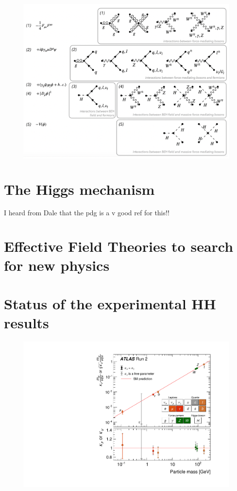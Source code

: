 \begin{figure}
\centering
\includegraphics[width=\textwidth]{figures/intro/mel-sm-diagrams.png}
\caption{\cite{Melissa-thesis}}
\label{fig:mel-sm}
\end{figure}

\section{The Higgs mechanism}
I heard from Dale that the pdg is a v good ref for this!!

\section{Effective Field Theories to search for new physics}

\section{Status of the experimental HH results}

\begin{figure}
\centering
\includegraphics[width=.7\textwidth]{figures/intro/atlas-nature-10yrs/fig_05}
\caption{\cite{2207.00092}}
\label{fig:pcle-mass-atlas}
\end{figure}
